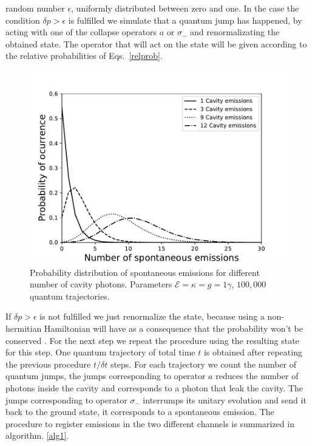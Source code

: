 \documentclass[%
 reprint,
 amsmath,amssymb,
 aps, 
]{revtex4-1}
\begin{document}
random number $\epsilon$, uniformly distributed between zero and one.
In the case the condition $\delta p > \epsilon$ is fulfilled we
simulate that a quantum jump has happened, by acting with one of the
collapse operators $a$ or $\sigma_-$ and renormalizating the obtained
state. The operator that will act on the state will be given according
to the relative probabilities of Eqs.~\eqref{relprob}.
\begin{figure}[!t] 
\centering
\includegraphics[scale = 0.5]{distributioneng.pdf}
\caption{Probability distribution of spontaneous emissions for
  different number of cavity photons. Parameters $\mathcal{E}  =
  \kappa =  g = 1\gamma$, $100,000$ quantum trajectories. } \label{probdiss}
\end{figure}
If $\delta p > \epsilon$ is not fulfilled we just renormalize the
state, because using a non-hermitian Hamiltonian will have as a
consequence that the probability won't be conserved
\cite{Sakurai:1167961}. For the next step we repeat the procedure
using the resulting state for this step. One quantum trajectory of
total time $t$ is obtained after repeating the previous procedure
$t/\delta t$ steps. For each trajectory we count the number of quantum
jumps, the jumps corresponding to operator $a$ reduces the number of
photons inside the cavity and corresponds to a photon that leak the
cavity. The jumps corresponding to operator $\sigma_-$ interrumps its
unitary evolution and send it back to the ground state, it corresponds
to a spontaneous emission. The procedure to register emissions in the
two different channels is summarized in algorithm. \ref{alg1}.
\end{document}

